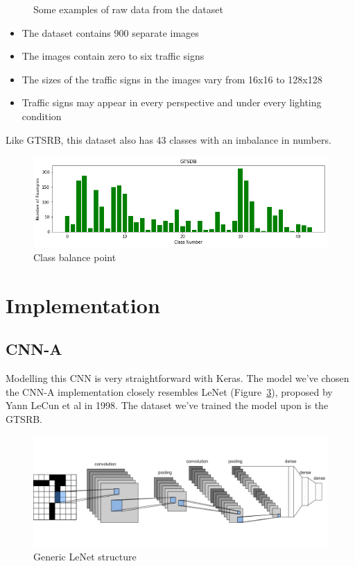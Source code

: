 \documentclass[12pt, landscape]{article}
\begin{document}
\begin{multicols}{3}
\begin{figure}[H]
\begin{tabular}{cc}
    \end{tabular}
    \caption{Some examples of raw data from the dataset}
    \label{fig:dataset2examples}
\end{figure}
\begin{itemize}
    \item The dataset contains 900 separate images
    \item The images contain zero to six traffic signs
    \item The sizes of the traffic signs in the images vary from 16x16 to 128x128
    \item Traffic signs may appear in every perspective and under every lighting
    condition
\end{itemize}

Like GTSRB, this dataset also has 43 classes with an imbalance in numbers.
\begin{figure}[H]
    \centerline{\includegraphics[scale = 0.5]{gtsdb.png}}
    \caption{Class balance point}
    \label{fig:dataset2balance}
\end{figure}


\section{Implementation}

\subsection{CNN-A}
Modelling this CNN is very straightforward with Keras. The model we've chosen the
CNN-A implementation closely resembles LeNet (Figure~\ref{fig:lenetstructure}),
proposed by Yann LeCun et al in 1998. The dataset we've trained the model upon
is the GTSRB.
\begin{figure}[H]
    \centerline{\includegraphics[scale = 0.2]{lenet.png}}
    \caption{Generic LeNet structure}
    \label{fig:lenetstructure}
\end{figure}


\end{multicols}
\end{document}

